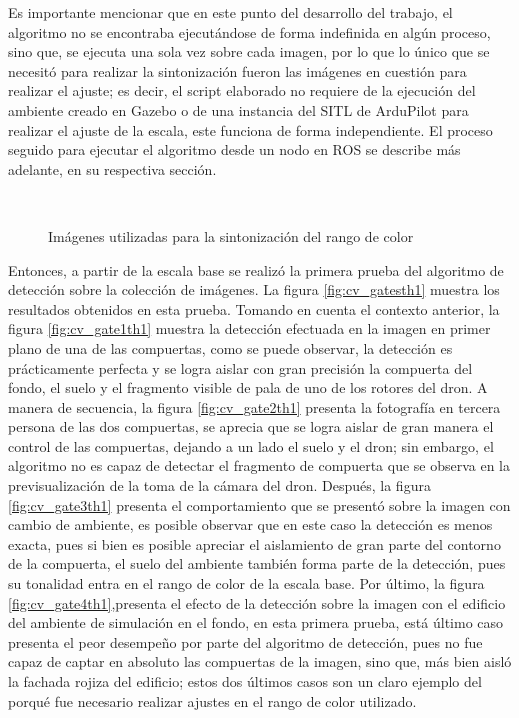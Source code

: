 Es importante mencionar que en este punto del desarrollo del trabajo, el algoritmo no se encontraba ejecutándose de forma indefinida en algún proceso, sino que, se ejecuta una sola vez sobre cada imagen, por lo que lo único que se necesitó para realizar la sintonización fueron las imágenes en cuestión para realizar el ajuste; es decir, el script elaborado no requiere de la ejecución del ambiente creado en Gazebo o de una instancia del SITL de ArduPilot para realizar el ajuste de la escala, este funciona de forma independiente. El proceso seguido para ejecutar el algoritmo desde un nodo en ROS se describe más adelante, en su respectiva sección.


\begin{figure}[ht]
    \centering
    \hfill
    \\
    \hfill
    \hfill

    \caption{Imágenes utilizadas para la sintonización del rango de color}
    \label{fig:cv_gates}
\end{figure}

Entonces, a partir de la escala base se realizó la primera prueba del algoritmo de detección sobre la colección de imágenes. La figura \ref{fig:cv_gatesth1} muestra los resultados obtenidos en esta prueba. Tomando en cuenta el contexto anterior, la figura \ref{fig:cv_gate1th1} muestra la detección efectuada en la imagen en primer plano de una de las compuertas, como se puede observar, la detección es prácticamente perfecta y se logra aislar con gran precisión la compuerta del fondo, el suelo y el fragmento visible de pala de uno de los rotores del dron. A manera de secuencia, la figura \ref{fig:cv_gate2th1} presenta la fotografía en tercera persona de las dos compuertas, se aprecia que se logra aislar de gran manera el control de las compuertas, dejando a un lado el suelo y el dron;  sin embargo, el algoritmo no es capaz de detectar el fragmento de compuerta que se observa en la previsualización de la toma de la cámara del dron. Después, la figura \ref{fig:cv_gate3th1} presenta el comportamiento que se presentó sobre la imagen con cambio de ambiente, es posible observar que en este caso la detección es menos exacta, pues si bien es posible apreciar el aislamiento de gran parte del contorno de la compuerta, el suelo del ambiente también forma parte de la detección, pues su tonalidad entra en el rango de color de la escala base. Por último, la figura \ref{fig:cv_gate4th1},presenta el efecto de la detección sobre la imagen con el edificio del ambiente de simulación en el fondo, en esta primera prueba, está último caso presenta el peor desempeño por parte del algoritmo de detección, pues no fue capaz de captar en absoluto las compuertas de la imagen, sino que, más bien aisló la fachada rojiza del edificio; estos dos últimos casos son un claro ejemplo del porqué fue necesario realizar ajustes en el rango de color utilizado.



